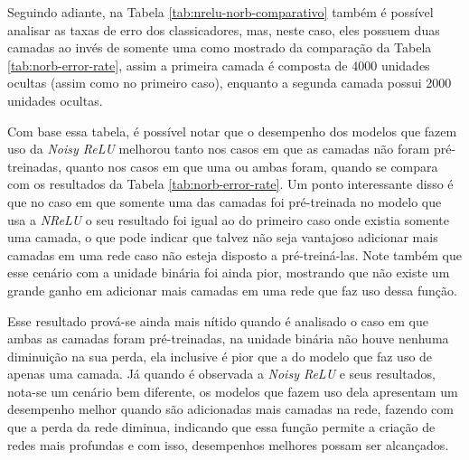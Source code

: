 Seguindo adiante, na Tabela \ref{tab:nrelu-norb-comparativo} também é possível analisar as taxas de erro dos classicadores, mas, neste caso, eles possuem duas camadas ao invés de somente uma como mostrado da comparação da Tabela \ref{tab:norb-error-rate}, assim a primeira camada é composta de 4000 unidades ocultas (assim como no primeiro caso), enquanto a segunda camada possui 2000 unidades ocultas. 

Com base essa tabela, é possível notar que o desempenho dos modelos que fazem uso da \textit{Noisy ReLU} melhorou tanto nos casos em que as camadas não foram pré-treinadas, quanto nos casos em que uma ou ambas foram, quando se compara com os resultados da Tabela \ref{tab:norb-error-rate}. Um ponto interessante disso é que no caso em que somente uma das camadas foi pré-treinada no modelo que usa a \textit{NReLU} o seu resultado foi igual ao do primeiro caso onde existia somente uma camada, o que pode indicar que talvez não seja vantajoso adicionar mais camadas em uma rede caso não esteja disposto a pré-treiná-las. Note também que esse cenário com a unidade binária foi ainda pior, mostrando que não existe um grande ganho em adicionar mais camadas em uma rede que faz uso dessa função.

Esse resultado prová-se ainda mais nítido quando é analisado o caso em que ambas as camadas foram pré-treinadas, na unidade binária não houve nenhuma diminuição na sua perda, ela inclusive é pior que a do modelo que faz uso de apenas uma camada. Já quando é observada a \textit{Noisy ReLU} e seus resultados, nota-se um cenário bem diferente, os modelos que fazem uso dela apresentam um desempenho melhor quando são adicionadas mais camadas na rede, fazendo com que a perda da rede diminua, indicando que essa função permite a criação de redes mais profundas e com isso, desempenhos melhores possam ser alcançados.

